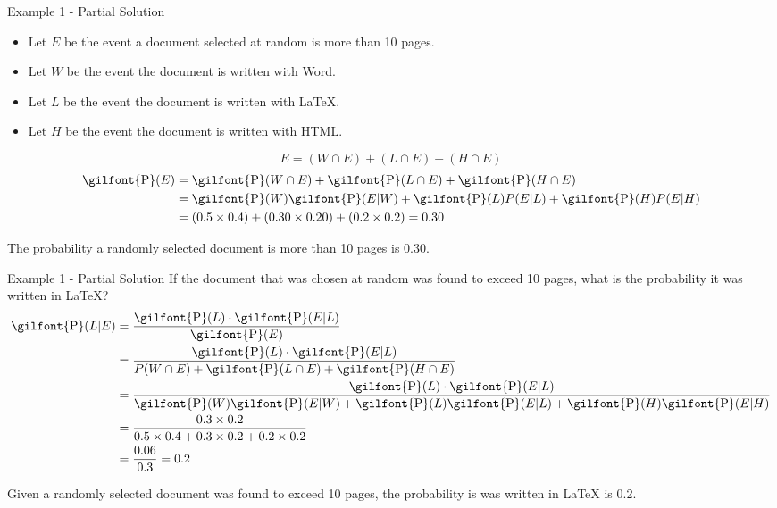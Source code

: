 \documentclass[
  ignorenonframetext,
]{beamer}
\begin{document}
\begin{frame}{Example 1 - Partial Solution}
\protect\hypertarget{example-1---partial-solution}{}
\begin{itemize}
\item Let $E$ be the event a document selected at random is more than 10 pages.
\item Let $W$ be the event the document is written with Word.
\item Let $L$ be the event the document is written with LaTeX.
\item Let $H$ be the event the document is written with HTML.
\end{itemize}

\[E = (W \cap E) + (L \cap E) + (H \cap E)\] \[
\begin{aligned}
\textrm{\gilfont{P}}\normalfont (E) &= \textrm{\gilfont{P}}\normalfont (W \cap E) + \textrm{\gilfont{P}}\normalfont (L \cap E) + \textrm{\gilfont{P}}\normalfont (H \cap E)\\
&= \textrm{\gilfont{P}}\normalfont (W)\textrm{\gilfont{P}}\normalfont (E|W) + \textrm{\gilfont{P}}\normalfont (L)P(E|L) + \textrm{\gilfont{P}}\normalfont (H)P(E|H)\\
&=(0.5 \times 0.4) + (0.30 \times 0.20) + (0.2 \times 0.2) = 0.30
\end{aligned}
\]

\begin{tcolorbox}
The probability a randomly selected document is more than 10 pages is 0.30.
\end{tcolorbox}
\end{frame}

\begin{frame}{Example 1 - Partial Solution}
\protect\hypertarget{example-1---partial-solution-1}{}
If the document that was chosen at random was found to exceed 10 pages,
what is the probability it was written in LaTeX? \[
\begin{aligned}
\textrm{\gilfont{P}}\normalfont (L | E) &= \frac{\textrm{\gilfont{P}}\normalfont (L)\cdot \textrm{\gilfont{P}}\normalfont (E|L)}{\textrm{\gilfont{P}}\normalfont (E)}\\
&=\frac{\textrm{\gilfont{P}}\normalfont (L)\cdot \textrm{\gilfont{P}}\normalfont (E|L)}{P(W \cap E) + \textrm{\gilfont{P}}\normalfont (L\cap E) + \textrm{\gilfont{P}}\normalfont (H \cap E)}\\
&=\frac{\textrm{\gilfont{P}}\normalfont (L)\cdot \textrm{\gilfont{P}}\normalfont (E|L)}{\textrm{\gilfont{P}}\normalfont (W)\textrm{\gilfont{P}}\normalfont (E|W) + \textrm{\gilfont{P}}\normalfont (L)\textrm{\gilfont{P}}\normalfont (E|L) + \textrm{\gilfont{P}}\normalfont (H)\textrm{\gilfont{P}}\normalfont (E|H)}\\
&=\frac{0.3 \times 0.2}{0.5 \times 0.4 + 0.3 \times 0.2 + 0.2 \times 0.2} \\
&=\frac{0.06}{0.3}= 0.2
\end{aligned}
\]

\begin{tcolorbox}
Given a randomly selected document was found to exceed 10 pages, the probability is was written in LaTeX is 0.2.
\end{tcolorbox}
\end{frame}
\end{document}
